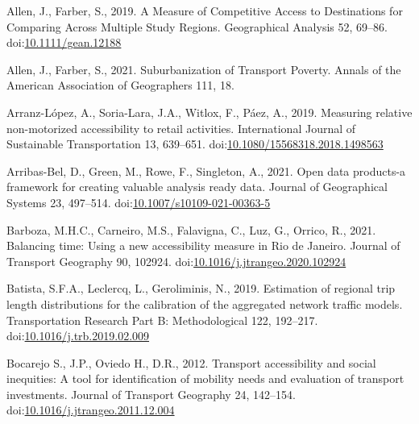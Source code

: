 \documentclass[]{elsarticle} %
\newlength{\cslhangindent}
\newlength{\cslentryspacingunit} %
\newenvironment{CSLReferences}[2] %
 {%
  \setlength{\parindent}{0pt}
  \ifodd #1
  \let\oldpar\par
  \def\par{\hangindent=\cslhangindent\oldpar}
  \fi
  \setlength{\parskip}{#2\cslentryspacingunit}
 }%
 {}
\begin{document}
\hypertarget{refs}{}
\begin{CSLReferences}{1}{0}
\leavevmode{}%
Allen, J., Farber, S., 2019. A Measure of Competitive Access to
Destinations for Comparing Across Multiple Study Regions. Geographical
Analysis 52, 69--86.
doi:\href{https://doi.org/10.1111/gean.12188}{10.1111/gean.12188}

\leavevmode{}%
Allen, J., Farber, S., 2021. Suburbanization of {Transport} {Poverty}.
Annals of the American Association of Geographers 111, 18.

\leavevmode{}%
Arranz-López, A., Soria-Lara, J.A., Witlox, F., Páez, A., 2019.
Measuring relative non-motorized accessibility to retail activities.
International Journal of Sustainable Transportation 13, 639--651.
doi:\href{https://doi.org/10.1080/15568318.2018.1498563}{10.1080/15568318.2018.1498563}

\leavevmode{}%
Arribas-Bel, D., Green, M., Rowe, F., Singleton, A., 2021. Open data
products-a framework for creating valuable analysis ready data. Journal
of Geographical Systems 23, 497--514.
doi:\href{https://doi.org/10.1007/s10109-021-00363-5}{10.1007/s10109-021-00363-5}

\leavevmode{}%
Barboza, M.H.C., Carneiro, M.S., Falavigna, C., Luz, G., Orrico, R.,
2021. Balancing time: {Using} a new accessibility measure in {Rio} de
{Janeiro}. Journal of Transport Geography 90, 102924.
doi:\href{https://doi.org/10.1016/j.jtrangeo.2020.102924}{10.1016/j.jtrangeo.2020.102924}

\leavevmode{}%
Batista, S.F.A., Leclercq, L., Geroliminis, N., 2019. Estimation of
regional trip length distributions for the calibration of the aggregated
network traffic models. Transportation Research Part B: Methodological
122, 192--217.
doi:\href{https://doi.org/10.1016/j.trb.2019.02.009}{10.1016/j.trb.2019.02.009}

\leavevmode{}%
Bocarejo S., J.P., Oviedo H., D.R., 2012. Transport accessibility and
social inequities: A tool for identification of mobility needs and
evaluation of transport investments. Journal of Transport Geography 24,
142--154.
doi:\href{https://doi.org/10.1016/j.jtrangeo.2011.12.004}{10.1016/j.jtrangeo.2011.12.004}


\end{CSLReferences}
\end{document}
